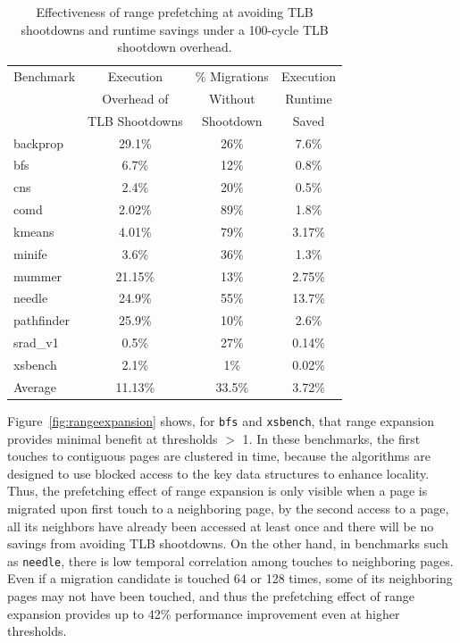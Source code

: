 \begin{table}[bh!]
\begin{center}
\begin{small}
\begin{tabular}{|l|c|c|c|}
\hline
Benchmark & Execution & \% Migrations & Execution\\
          & Overhead of        &Without  & Runtime\\
          & TLB Shootdowns    & Shootdown & Saved\\
\hline
backprop & 29.1\%& 26\% & 7.6\%\\
bfs & 6.7\%&12\% & 0.8\%\\
cns & 2.4\%&20\% & 0.5\%\\
comd & 2.02\%&89\% & 1.8\%\\
kmeans & 4.01\%&79\% & 3.17\%\\
minife & 3.6\%&36\% & 1.3\%\\
mummer & 21.15\%&13\% & 2.75\%\\
needle & 24.9\%&55\% & 13.7\%\\
pathfinder & 25.9\%&10\% & 2.6\%\\
srad\_v1 & 0.5\%&27\% & 0.14\%\\
xsbench & 2.1\%&1\% & 0.02\%\\
\hline
Average & 11.13\%&33.5\% & 3.72\%\\
\hline
\end{tabular}
\caption{Effectiveness of range prefetching at avoiding TLB shootdowns and runtime savings under a 100-cycle TLB shootdown overhead.}
\label{tab:shootdowns}
\end{small}
\end{center}
\end{table}

Figure~\ref{fig:rangeexpansion} shows, for {\tt bfs} and {\tt xsbench}, that range expansion provides minimal
benefit at thresholds $>$ 1. In these benchmarks, the first touches to
contiguous pages are clustered in time, because the algorithms are designed to use blocked access to the key 
data structures to enhance locality. Thus, the prefetching effect of range
expansion is only visible when a page is migrated upon first touch to a
neighboring page, by the second access to a page, all its neighbors have already been accessed 
at least once and there will be no savings from avoiding TLB shootdowns. On the other hand, in benchmarks 
such as {\tt needle}, there is low temporal correlation among touches to neighboring pages.
Even if a migration candidate is touched 64 or 128 times, some of its
neighboring pages may not have been touched, and thus the prefetching
effect of range expansion provides up to 42\% performance improvement even at higher thresholds.

